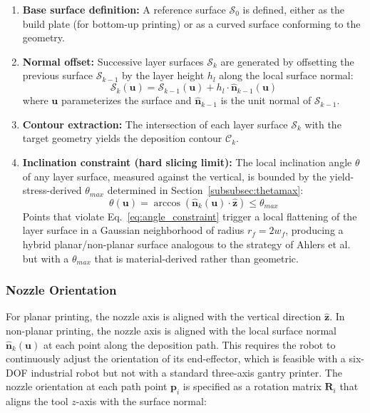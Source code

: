 \documentclass[conference]{IEEEtran}
\begin{document}
\begin{enumerate}
    \item \textbf{Base surface definition:} A reference surface $\mathcal{S}_0$ is defined, either as the build plate (for bottom-up printing) or as a curved surface conforming to the geometry.
    \item \textbf{Normal offset:} Successive layer surfaces $\mathcal{S}_k$ are generated by offsetting the previous surface $\mathcal{S}_{k-1}$ by the layer height $h_l$ along the local surface normal:
    \begin{equation}
        \mathcal{S}_k(\mathbf{u}) = \mathcal{S}_{k-1}(\mathbf{u}) + h_l \cdot \hat{\mathbf{n}}_{k-1}(\mathbf{u})
        \label{eq:offset}
    \end{equation}
    where $\mathbf{u}$ parameterizes the surface and $\hat{\mathbf{n}}_{k-1}$ is the unit normal of $\mathcal{S}_{k-1}$.
    \item \textbf{Contour extraction:} The intersection of each layer surface $\mathcal{S}_k$ with the target geometry yields the deposition contour $\mathcal{C}_k$.
    \item \textbf{Inclination constraint (hard slicing limit):} The local inclination angle $\theta$ of any layer surface, measured against the vertical, is bounded by the yield-stress-derived $\theta_{max}$ determined in Section~\ref{subsubsec:thetamax}:
    \begin{equation}
        \theta(\mathbf{u}) = \arccos\left(\hat{\mathbf{n}}_k(\mathbf{u}) \cdot \hat{\mathbf{z}}\right) \leq \theta_{max}
        \label{eq:angle_constraint}
    \end{equation}
    Points that violate Eq.~\ref{eq:angle_constraint} trigger a local flattening of the layer surface in a Gaussian neighborhood of radius $r_f = 2 w_f$, producing a hybrid planar/non-planar surface analogous to the strategy of Ahlers et al.~\cite{ahlers_3d_2019} but with a $\theta_{max}$ that is material-derived rather than geometric.
\end{enumerate}

\subsubsection{Nozzle Orientation}

For planar printing, the nozzle axis is aligned with the vertical direction $\hat{\mathbf{z}}$. In non-planar printing, the nozzle axis is aligned with the local surface normal $\hat{\mathbf{n}}_k(\mathbf{u})$ at each point along the deposition path. This requires the robot to continuously adjust the orientation of its end-effector, which is feasible with a six-DOF industrial robot but not with a standard three-axis gantry printer. The nozzle orientation at each path point $\mathbf{p}_i$ is specified as a rotation matrix $\mathbf{R}_i$ that aligns the tool $z$-axis with the surface normal:
\end{document}
